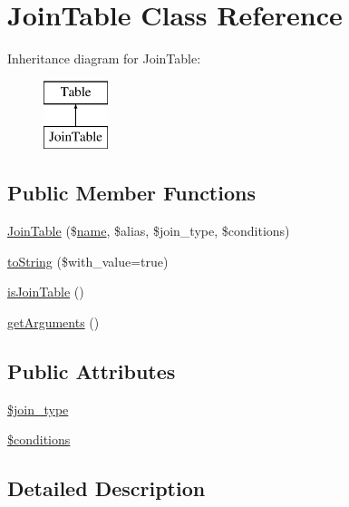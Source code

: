 \hypertarget{classJoinTable}{}\section{Join\+Table Class Reference}
\label{classJoinTable}
Inheritance diagram for Join\+Table\+:\begin{figure}[H]
\begin{center}
\leavevmode
\includegraphics[height=2.000000cm]{classJoinTable}
\end{center}
\end{figure}
\subsection*{Public Member Functions}
\begin{DoxyCompactItemize}
\item 
\hyperlink{classJoinTable_a70859ad638b9149e97b8209d4f73610e}{Join\+Table} (\$\hyperlink{common_8js_a22c29d2aa8ed6161ce8faa718ef76e68}{name}, \$alias, \$join\+\_\+type, \$conditions)
\item 
\hyperlink{classJoinTable_aa1e393a7b04e3b591ebd0fe6dff46f42}{to\+String} (\$with\+\_\+value=true)
\item 
\hyperlink{classJoinTable_aa26630df96bb0dac2ddcccff34c91530}{is\+Join\+Table} ()
\item 
\hyperlink{classJoinTable_a2f8aae7c1c5d0879f1085b9280018b4e}{get\+Arguments} ()
\end{DoxyCompactItemize}
\subsection*{Public Attributes}
\begin{DoxyCompactItemize}
\item 
\hyperlink{classJoinTable_a00c6a8c44beb3b85c9f3a3e5be03fba8}{\$join\+\_\+type}
\item 
\hyperlink{classJoinTable_aeaff6b550d1e29eef836ed19a8d65a99}{\$conditions}
\end{DoxyCompactItemize}


\subsection{Detailed Description}



